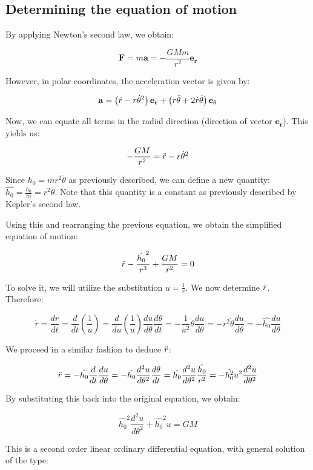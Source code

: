 \documentclass[12pt]{article}
\begin{document}
\subsection{Determining the equation of motion}

By applying Newton's second law, we obtain:

\[ \mathbf{F} = m\mathbf{a} = -\frac{GMm}{r^2}\mathbf{e_r} \]

However, in polar coordinates, the acceleration vector is given by:

\[ \mathbf{a} = \left(\Ddot{r} - r\dot{\theta}^2\right)\mathbf{e_r} + \left(r\Ddot{\theta} + 2\dot{r}\dot{\theta}\right)\mathbf{e_{\theta}} \]

Now, we can equate all terms in the radial direction (direction of vector $\mathbf{e_r}$). This yields us:

\[ -\frac{GM}{r^2} = \Ddot{r} - r\dot{\theta}^2 \]

Since $h_0 = mr^2\dot{\theta}$ as previously described, we can define a new quantity: $\hat{h_0} = \frac{h_0}{m} = r^2\dot{\theta}$. Note that this quantity is a constant as previously described by Kepler's second law.

Using this and rearranging the previous equation, we obtain the simplified equation of motion:

\[ \Ddot{r} - \frac{\hat{h_0}^2}{r^3} + \frac{GM}{r^2} = 0 \]

To solve it, we will utilize the substitution $u = \frac{1}{r}$. We now determine $\Ddot{r}$. Therefore:

\[ \dot{r} = \frac{dr}{dt} = \frac{d}{dt}\left(\frac{1}{u}\right) = \frac{d}{du}\left(\frac{1}{u}\right)\frac{du}{d\theta}\frac{d\theta}{dt} = -\frac{1}{u^2}\dot{\theta}\frac{du}{d\theta} = -r^2\dot{\theta}\frac{du}{d\theta} = -\hat{h_0}\frac{du}{d\theta} \]

We proceed in a similar fashion to deduce $\Ddot{r}$:

\[ \Ddot{r} = -\hat{h_0}\frac{d}{dt}\frac{du}{d\theta} = -\hat{h_0} \frac{d^2u}{d\theta^2}\frac{d\theta}{dt} = \hat{h_0}\frac{d^2u}{d\theta^2}\frac{\hat{h_0}}{r^2} = -\hat{h_0^2}u^2\frac{d^2u}{d\theta^2}\]

By substituting this back into the original equation, we obtain:

\[ \hat{h_0}^2\frac{d^2u}{d\theta^2} + \hat{h_0}^2u = GM \]

This is a second order linear ordinary differential equation, with general solution of the type:
\end{document}

